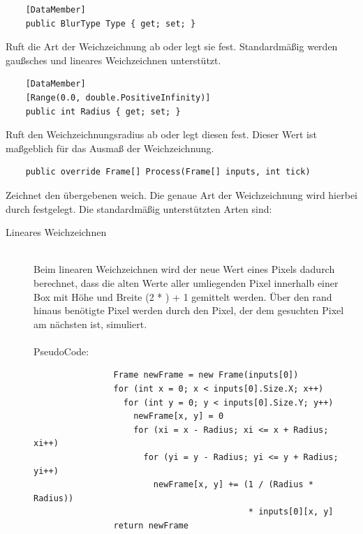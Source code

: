 \begin{itemize}

	\begin{verbatim}
	[DataMember]
	public BlurType Type { get; set; }
	\end{verbatim}
	Ruft die Art der Weichzeichnung ab oder legt sie fest. Standardmäßig werden gaußsches und lineares Weichzeichnen unterstützt.
	
	\begin{verbatim}
	[DataMember]
	[Range(0.0, double.PositiveInfinity)]
	public int Radius { get; set; }
	\end{verbatim}
	Ruft den Weichzeichnungsradius ab oder legt diesen fest. Dieser Wert ist maßgeblich für das Ausmaß der Weichzeichnung.

	\begin{verbatim}
	public override Frame[] Process(Frame[] inputs, int tick)
	\end{verbatim}
	Zeichnet den übergebenen  weich. Die genaue Art der Weichzeichnung wird hierbei durch  festgelegt. Die standardmäßig unterstützten Arten sind:
	\begin{description}
		\item[Lineares Weichzeichnen]~\\
			Beim linearen Weichzeichnen wird der neue Wert eines Pixels dadurch berechnet, dass die alten Werte aller umliegenden Pixel innerhalb einer Box mit Höhe und Breite (2 * ) + 1 gemittelt werden. Über den rand hinaus benötigte Pixel werden durch den Pixel, der dem gesuchten Pixel am nächsten ist, simuliert. ~\\~\\
			PseudoCode:
			\begin{verbatim}
				Frame newFrame = new Frame(inputs[0])
				for (int x = 0; x < inputs[0].Size.X; x++)
				  for (int y = 0; y < inputs[0].Size.Y; y++)
				    newFrame[x, y] = 0
				    for (xi = x - Radius; xi <= x + Radius; xi++)
				      for (yi = y - Radius; yi <= y + Radius; yi++)
				        newFrame[x, y] += (1 / (Radius * Radius))
				                           * inputs[0][x, y]
				return newFrame
				

\end{verbatim}
\end{description}
\end{itemize}
